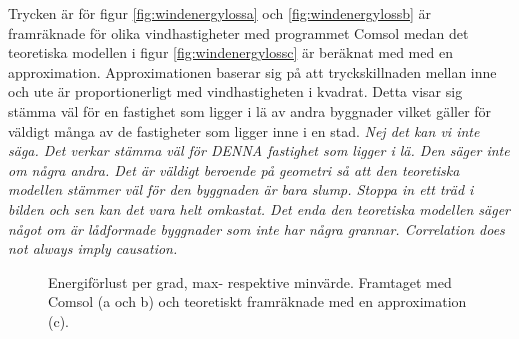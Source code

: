 Trycken är för figur \ref{fig:windenergylossa} och \ref{fig:windenergylossb} är framräknade för 
olika vindhastigheter med programmet Comsol medan det teoretiska modellen i figur 
\ref{fig:windenergylossc} är beräknat med med en approximation. Approximationen baserar sig
 på att tryckskillnaden mellan inne och ute är proportionerligt med vindhastigheten i kvadrat. 
 Detta visar sig stämma väl för en fastighet som ligger i lä av andra byggnader vilket gäller för 
 väldigt många av de fastigheter som ligger inne i en stad. \emph{\color{red} Nej det kan vi inte säga.
Det verkar stämma väl för DENNA fastighet som ligger i lä. Den säger inte om några andra. Det är väldigt
beroende på geometri så att den teoretiska modellen stämmer väl för den byggnaden är bara slump. Stoppa in
ett träd i bilden och sen kan det vara helt omkastat. Det enda den teoretiska modellen säger något om är lådformade
byggnader som inte har några grannar. Correlation does not always imply causation.}

\begin{figure}[hpbt]
\centering
{}
\vspace{5mm}


\caption{\label{fig:windenergyloss}Energiförlust per grad, max- respektive minvärde.
Framtaget med Comsol (a och b) och teoretiskt framräknade med en approximation (c).}
\end{figure}

